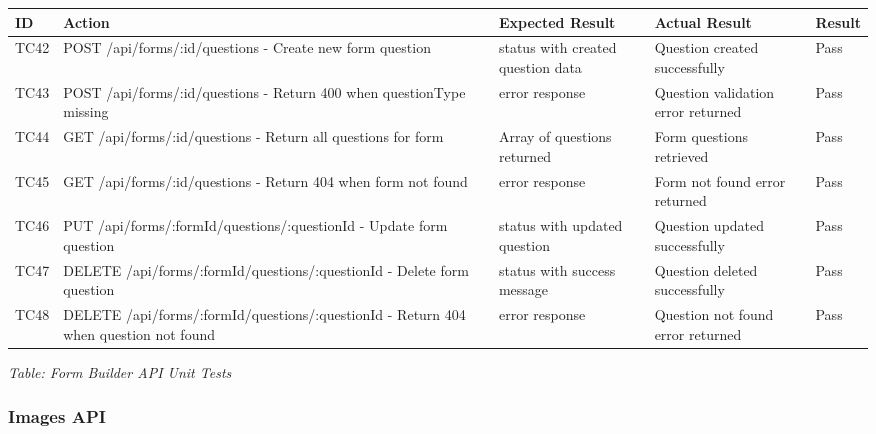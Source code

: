 \documentclass[12pt, titlepage]{article}
\begin{document}
\noindent
\begin{longtable}{|>{\raggedright\arraybackslash}p{1cm}|>{\raggedright\arraybackslash}p{4.5cm}|>{\raggedright\arraybackslash}p{3.5cm}|>{\raggedright\arraybackslash}p{3.5cm}|>{\raggedright\arraybackslash}p{1.5cm}|}
\hline
\textbf{ID} & \textbf{Action} & \textbf{Expected Result} & \textbf{Actual Result} & \textbf{Result} \\\hline
\endhead
\hline
TC42 & POST /api/forms/:id/questions - Create new form question & 201 status with created question data & Question created successfully & \cellcolor{green!30}Pass \\
\hline
TC43 & POST /api/forms/:id/questions - Return 400 when questionType missing & 400 error response & Question validation error returned & \cellcolor{green!30}Pass \\
\hline
TC44 & GET /api/forms/:id/questions - Return all questions for form & Array of questions returned & Form questions retrieved & \cellcolor{green!30}Pass \\
\hline
TC45 & GET /api/forms/:id/questions - Return 404 when form not found & 404 error response & Form not found error returned & \cellcolor{green!30}Pass \\
\hline
TC46 & PUT /api/forms/:formId/questions/:questionId - Update form question & 200 status with updated question & Question updated successfully & \cellcolor{green!30}Pass \\
\hline
TC47 & DELETE /api/forms/:formId/questions/:questionId - Delete form question & 200 status with success message & Question deleted successfully & \cellcolor{green!30}Pass \\
\hline
TC48 & DELETE /api/forms/:formId/questions/:questionId - Return 404 when question not found & 404 error response & Question not found error returned & \cellcolor{green!30}Pass \\
\hline
\end{longtable}

\vspace{0.5cm}

{\small \textit{Table: Form Builder API Unit Tests}}

\subsubsection{Images API}
\end{document}
